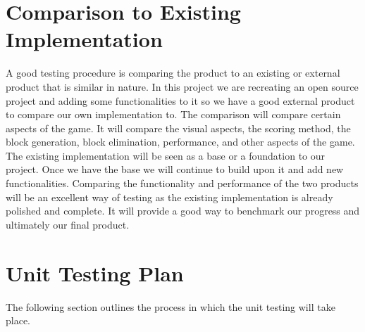 \documentclass[12pt, titlepage]{article}
\begin{document}
\section{Comparison to Existing Implementation}
A good testing procedure is comparing the product to an existing or external product that is similar in nature. In this project we are recreating an open source project and adding some functionalities to it so we have a good external product to compare our own implementation to. The comparison will compare certain aspects of the game. It will compare the visual aspects, the scoring method, the block generation, block elimination, performance, and other aspects of the game. The existing implementation will be seen as a base or a foundation to our project. Once we have the base we will continue to build upon it and add new functionalities. Comparing the functionality and performance of the two products will be an excellent way of testing as the existing implementation is already polished and complete. It will provide a good way to benchmark our progress and ultimately our final product.

\section{Unit Testing Plan}
The following section outlines the process in which the unit testing will take place.
\end{document}

